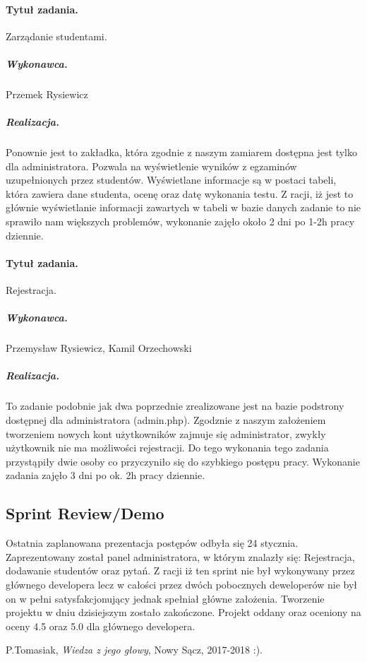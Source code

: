 \documentclass[a4paper]{article}
\begin{document}
\paragraph{Tytuł zadania.} Zarządanie studentami.
\subparagraph{Wykonawca.} Przemek Rysiewicz
\subparagraph{Realizacja.} Ponownie jest to zakładka, która zgodnie z naszym zamiarem dostępna jest tylko dla administratora. Pozwala na wyświetlenie wyników z egzaminów uzupełnionych przez studentów. Wyświetlane informacje są w postaci tabeli, która zawiera dane studenta, ocenę oraz datę wykonania testu. Z racji, iż jest to głównie wyświetlanie informacji zawartych w tabeli w bazie danych zadanie to nie sprawiło nam większych problemów, wykonanie zajęło około 2 dni po 1-2h pracy dziennie.

\paragraph{Tytuł zadania.} Rejestracja.
\subparagraph{Wykonawca.} Przemysław Rysiewicz, Kamil Orzechowski
\subparagraph{Realizacja.} To zadanie podobnie jak dwa poprzednie zrealizowane jest na bazie podstrony dostępnej dla administratora (admin.php). Zgodznie z naszym założeniem tworzeniem nowych kont użytkowników zajmuje się administrator, zwykły użytkownik nie ma możliwości rejestracji. Do tego wykonania tego zadania przystąpiły dwie osoby co przyczyniło się do szybkiego postępu pracy.  Wykonanie zadania zajęło 3 dni po ok. 2h pracy dziennie.

\subsection{Sprint Review/Demo}
Ostatnia zaplanowana prezentacja postępów odbyła się 24 stycznia. Zaprezentowany został panel administratora, w którym znalazły się: Rejestracja, dodawanie studentów oraz pytań. Z racji iż ten sprint nie był wykonywany przez głównego developera lecz w całości przez dwóch pobocznych deweloperów nie był on w pełni satysfakcjonujący jednak spełniał główne założenia. Tworzenie projektu w dniu dzisiejszym zostało zakończone. Projekt oddany oraz oceniony na oceny 4.5 oraz 5.0 dla głównego developera.



\begin{thebibliography}{9}

 P.Tomasiak, {\em Wiedza z jego głowy}, Nowy Sącz, 2017-2018 :).

\end{thebibliography}
\end{document}
